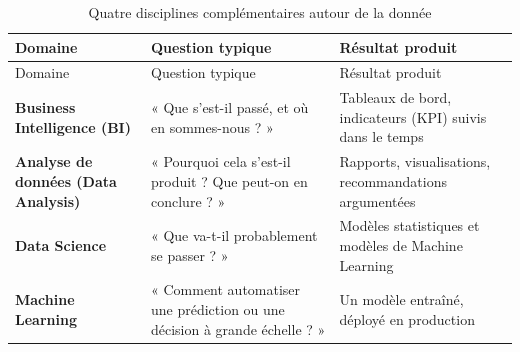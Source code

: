 \documentclass[
  french,
  letterpaper,
  open=any]{scrbook}
\theoremstyle{definition}
\theoremstyle{definition}
\theoremstyle{remark}
\begin{document}
\begin{longtable}[]{@{}
  >{\raggedright\arraybackslash}p{}
  >{\raggedright\arraybackslash}p{}
  >{\raggedright\arraybackslash}p{}@{}}
\caption{Quatre disciplines complémentaires autour de la
donnée}\label{tbl-disciplines-donnees}\tabularnewline
\toprule\noalign{}
\begin{minipage}[b]{\linewidth}\raggedright
Domaine
\end{minipage} & \begin{minipage}[b]{\linewidth}\raggedright
Question typique
\end{minipage} & \begin{minipage}[b]{\linewidth}\raggedright
Résultat produit
\end{minipage} \\
\midrule\noalign{}
\endfirsthead
\toprule\noalign{}
\begin{minipage}[b]{\linewidth}\raggedright
Domaine
\end{minipage} & \begin{minipage}[b]{\linewidth}\raggedright
Question typique
\end{minipage} & \begin{minipage}[b]{\linewidth}\raggedright
Résultat produit
\end{minipage} \\
\midrule\noalign{}
\endhead
\bottomrule\noalign{}
\endlastfoot
\textbf{Business Intelligence (BI)} & « Que s'est-il passé, et où en
sommes-nous ? » & Tableaux de bord, indicateurs (KPI) suivis dans le
temps \\
\textbf{Analyse de données (Data Analysis)} & « Pourquoi cela s'est-il
produit ? Que peut-on en conclure ? » & Rapports, visualisations,
recommandations argumentées \\
\textbf{Data Science} & « Que va-t-il probablement se passer ? » &
Modèles statistiques et modèles de Machine Learning \\
\textbf{Machine Learning} & « Comment automatiser une prédiction ou une
décision à grande échelle ? » & Un modèle entraîné, déployé en
production \\
\end{longtable}
\end{document}

